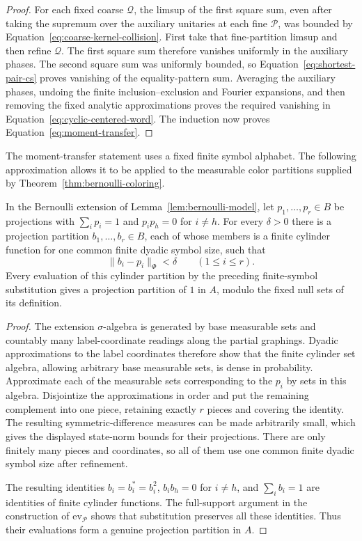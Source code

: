 \begin{proof}
For each fixed coarse $\mathcal Q$, the limsup of the first square sum,
even after taking the supremum over the auxiliary unitaries at each
fine $\mathcal P$, was bounded by
Equation~\eqref{eq:coarse-kernel-collision}. First take that fine-partition
limsup and then refine $\mathcal Q$. The first square sum therefore
vanishes uniformly in the auxiliary phases. The second square sum was
uniformly bounded, so Equation~\eqref{eq:shortest-pair-cs} proves
vanishing of the equality-pattern sum. Averaging the auxiliary phases,
undoing the finite inclusion--exclusion and Fourier expansions, and
then removing the fixed analytic approximations proves the required
vanishing in Equation~\eqref{eq:cyclic-centered-word}. The induction
now proves Equation~\eqref{eq:moment-transfer}.
\end{proof}

The moment-transfer statement uses a fixed finite symbol alphabet.
The following approximation allows it to be applied to the measurable
color partitions supplied by Theorem~\ref{thm:bernoulli-coloring}.

\begin{lemma}
\label{lem:cylinder-partitions}
In the Bernoulli extension of Lemma~\ref{lem:bernoulli-model}, let
$p_1,\ldots,p_r\in B$ be projections with $\sum_i p_i=1$ and
$p_ip_h=0$ for $i\ne h$. For every $\delta>0$ there is a projection
partition $b_1,\ldots,b_r\in B$, each of whose members is a finite
cylinder function for one common finite dyadic symbol size, such that
\[
 \|b_i-p_i\|_\Phi<\delta\qquad(1\le i\le r).
\]
Every evaluation of this cylinder partition by the preceding
finite-symbol substitution gives a projection partition of $1$ in
$A$, modulo the fixed null sets of its definition.
\end{lemma}

\begin{proof}
The extension $\sigma$-algebra is generated by base measurable sets and
countably many label-coordinate readings along the partial graphings.
Dyadic approximations to the label coordinates therefore show that the
finite cylinder set algebra, allowing arbitrary base measurable sets,
is dense in probability. Approximate each of the measurable sets
corresponding to the $p_i$ by sets in this algebra. Disjointize the
approximations in order and put the remaining complement into one
piece, retaining exactly $r$ pieces and covering the identity. The
resulting symmetric-difference measures can be made arbitrarily small,
which gives the displayed state-norm bounds for their projections.
There are only finitely many pieces and coordinates, so all of them
use one common finite dyadic symbol size after refinement.

The resulting identities $b_i=b_i^*=b_i^2$, $b_ib_h=0$ for $i\ne h$,
and $\sum_i b_i=1$ are identities of finite cylinder functions. The
full-support argument in the construction of $\mathrm{ev}_{\mathcal P}$
shows that substitution preserves all these identities. Thus their
evaluations form a genuine projection partition in $A$.
\end{proof}
